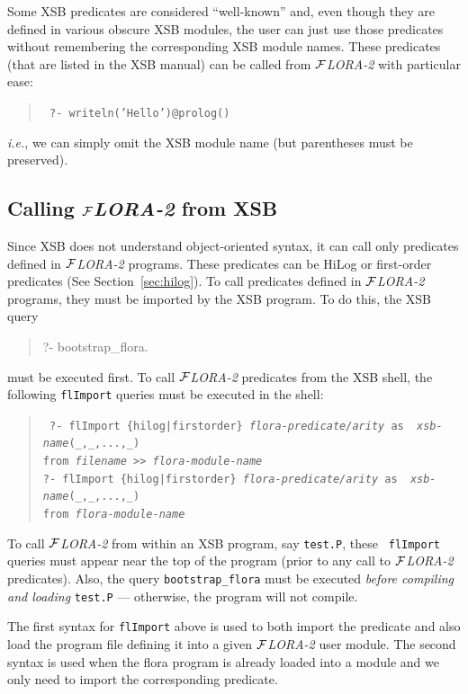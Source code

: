 \documentclass[11pt]{article}
\newcommand{\FLORA}{{\mbox{${\cal F}${\small\it LORA}\rm\emph{-2}}}\xspace}
\begin{document}
Some XSB predicates are considered ``well-known'' and, even though they are
defined in various obscure XSB modules, the user can just use those predicates
without remembering the corresponding XSB module names. These predicates
(that are listed in the XSB manual) can be called from \FLORA with
particular ease:
\begin{quote}
 \tt
 ?- writeln('Hello')@prolog()
\end{quote}
{\it i.e.}, we can simply omit the XSB module name (but parentheses must be
preserved). 




\subsection{Calling \FLORA from XSB}

Since XSB does not understand object-oriented syntax, it can call only
predicates defined in \FLORA programs. These predicates can be HiLog or
first-order predicates (See Section~\ref{sec:hilog}). To call predicates
defined in \FLORA programs, they must be imported by the XSB program.
To do this, the XSB query
\begin{quote}
 ?- bootstrap\_flora.  
\end{quote}
must be executed first. To call \FLORA predicates from the XSB shell,
the following {\tt flImport} queries must be executed in the shell:
\begin{quote}
  \tt
   ?- flImport \{hilog|firstorder\} {\it flora-predicate/arity} as {\it
     xsb-name}(\_,\_,...,\_)\\
   \hspace*{5cm}from {\it filename} >> {\it flora-module-name}
   \\
   ?- flImport \{hilog|firstorder\} {\it flora-predicate/arity} as {\it 
     xsb-name}(\_,\_,...,\_)\\
   \hspace*{5cm}from {\it flora-module-name}
\end{quote}
To call \FLORA from within an XSB program, say {\tt test.P}, these {\tt
  flImport} queries must appear near the top of the program (prior to any
call to \FLORA predicates). Also, the query {\tt bootstrap\_flora} must be
executed \emph{before compiling and loading} {\tt test.P} --- otherwise,
the program will not compile.

The first syntax for {\tt flImport} above is used to both import the
predicate and also load the program file defining it into a given \FLORA
user module. The second syntax is used when the flora program is already
loaded into a module and we only need to import the corresponding
predicate.
\end{document}
